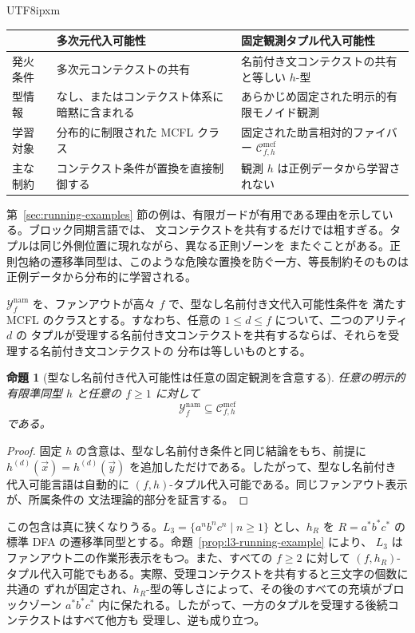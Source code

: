 \documentclass[10pt,a4paper]{article}
\newtheorem{proposition}[theorem]{命題}
\theoremstyle{remark}
\newcommand{\Cmcf}[2]{\mathcal{C}^{\mathrm{mcf}}_{#1,#2}}
\newcommand{\Yclass}[1]{\mathcal{Y}_{#1}}
\newcommand{\tuple}[1]{\vec{#1}}
\begin{document}
\begin{CJK}{UTF8}{ipxm}
\begin{center}
\begin{tabular}{|p{}|p{}|p{}|}
\hline
 & 多次元代入可能性 & 固定観測タプル代入可能性 \\
\hline
発火条件 & 多次元コンテクストの共有 & 名前付き文コンテクストの共有と等しい \(h\)-型 \\
\hline
型情報 & なし、またはコンテクスト体系に暗黙に含まれる & あらかじめ固定された明示的有限モノイド観測 \\
\hline
学習対象 & 分布的に制限された MCFL クラス & 固定された助言相対的ファイバー \(\Cmcf{f}{h}\) \\
\hline
主な制約 & コンテクスト条件が置換を直接制御する & 観測 \(h\) は正例データから学習されない \\
\hline
\end{tabular}
\end{center}

第~\ref{sec:running-examples} 節の例は、有限ガードが有用である理由を示している。ブロック同期言語では、
文コンテクストを共有するだけでは粗すぎる。タプルは同じ外側位置に現れながら、異なる正則ゾーンを
またぐことがある。正則包絡の遷移準同型は、このような危険な置換を防ぐ一方、等長制約そのものは
正例データから分布的に学習される。

\(\Yclass{f}^{\mathrm{nam}}\) を、ファンアウトが高々 \(f\) で、型なし名前付き文代入可能性条件を
満たす MCFL のクラスとする。すなわち、任意の \(1\le d\le f\) について、二つのアリティ \(d\) の
タプルが受理する名前付き文コンテクストを共有するならば、それらを受理する名前付き文コンテクストの
分布は等しいものとする。

\begin{proposition}[型なし名前付き代入可能性は任意の固定観測を含意する]
\label{prop:untyped-named-implies-fixed-h}
任意の明示的有限準同型 \(h\) と任意の \(f\ge1\) に対して
\[
  \Yclass{f}^{\mathrm{nam}}\subseteq \Cmcf{f}{h}
\]
である。
\end{proposition}

\begin{proof}
固定 \(h\) の含意は、型なし名前付き条件と同じ結論をもち、前提に
\(h^{(d)}(\tuple x)=h^{(d)}(\tuple y)\) を追加しただけである。したがって、型なし名前付き
代入可能言語は自動的に \((f,h)\)-タプル代入可能である。同じファンアウト表示が、所属条件の
文法理論的部分を証言する。
\end{proof}

この包含は真に狭くなりうる。\(L_3=\{a^n b^n c^n\mid n\ge1\}\) とし、\(h_R\) を
\(R=a^*b^*c^*\) の標準 DFA の遷移準同型とする。命題~\ref{prop:l3-running-example} により、
\(L_3\) はファンアウト二の作業形表示をもつ。また、すべての \(f\ge2\) に対して
\((f,h_R)\)-タプル代入可能でもある。実際、受理コンテクストを共有すると三文字の個数に共通の
ずれが固定され、\(h_R\)-型の等しさによって、その後のすべての充填がブロックゾーン
\(a^*b^*c^*\) 内に保たれる。したがって、一方のタプルを受理する後続コンテクストはすべて他方も
受理し、逆も成り立つ。


\end{CJK}
\end{document}
